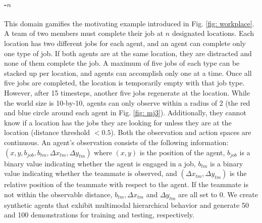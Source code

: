 \paragraph{\simplemulti-$n$} This domain gamifies the motivating example introduced in Fig. \ref{fig: workplace}. A team of two members must complete their job at $n$ designated locations. Each location has two different jobs for each agent, and an agent can complete only one type of job. If both agents are at the same location, they are distracted and none of them complete the job. A maximum of five jobs of each type can be stacked up per location, and agents can accomplish only one at a time. Once all five jobs are completed, the location is temporarily empty with that job type. However, after 15 timesteps, another five jobs regenerate at the location. While the world size is 10-by-10, agents can only observe within a radius of 2 (the red and blue circle around each agent in Fig. \ref{fig: mj3}). 
Additionally, they cannot know if a location has the jobs they are looking for unless they are at the location (distance threshold $< 0.5$). 
Both the observation and action spaces are continuous. An agent's observation consists of the following information: $(x, y, b_{job}, b_{tm},\Delta x_{tm}, \Delta y_{tm})$ where $(x, y)$ is the position of the agent, $b_{job}$ is a binary value indicating whether the agent is engaged in a job, $b_{tm}$ is a binary value indicating whether the teammate is observed, and $(\Delta x_{tm}, \Delta y_{tm})$ is the relative position of the teammate with respect to the agent. If the teammate is not within the observable distance, $b_{tm}, \Delta x_{tm}$ and $\Delta y_{tm}$ are all set to 0. We create synthetic agents that exhibit multimodal hierarchical behavior and generate 50 and 100 demonstrations for training and testing, respectively.


